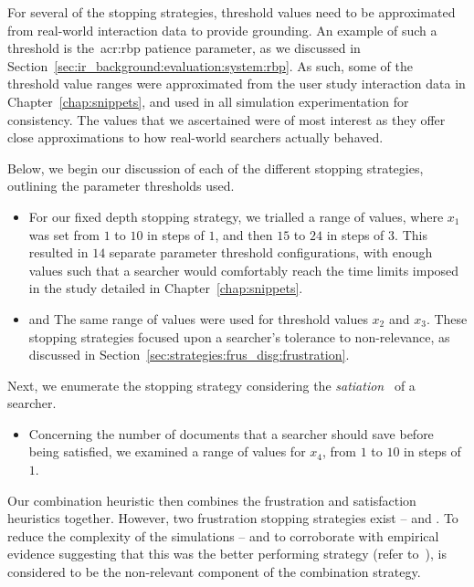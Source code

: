 For several of the stopping strategies, threshold values need to be approximated from real-world interaction data to provide grounding. An example of such a threshold is the~\gls{acr:rbp} patience parameter, as we discussed in Section~\ref{sec:ir_background:evaluation:system:rbp}. As such, some of the threshold value ranges were approximated from the user study interaction data in Chapter~\ref{chap:snippets}, and used in all simulation experimentation for consistency. The values that we ascertained were of most interest as they offer close approximations to how real-world searchers actually behaved.

Below, we begin our discussion of each of the different stopping strategies, outlining the parameter thresholds used.

\begin{itemize}
    \item{ For our fixed depth stopping strategy, we trialled a range of values, where $x_1$ was set from $1$ to $10$ in steps of $1$, and then $15$ to $24$ in steps of $3$. This resulted in $14$ separate parameter threshold configurations, with enough values such that a searcher would comfortably reach the time limits imposed in the study detailed in Chapter~\ref{chap:snippets}.}
    
    \item{ and  The same range of values were used for threshold values $x_2$ and $x_3$. These stopping strategies focused upon a searcher's tolerance to non-relevance, as discussed in Section~\ref{sec:strategies:frus_disg:frustration}.}
\end{itemize}

Next, we enumerate the stopping strategy considering the \emph{satiation}~\citep{simon1955satiation} of a searcher.

\begin{itemize}
    \item{ Concerning the number of documents that a searcher should save before being satisfied, we examined a range of values for $x_4$, from $1$ to $10$ in steps of $1$.}
\end{itemize}

Our combination heuristic then combines the frustration and satisfaction heuristics together. However, two frustration stopping strategies exist --  and . To reduce the complexity of the simulations -- and to corroborate with empirical evidence suggesting that this was the better performing strategy (refer to~\cite{maxwell2015stopping_strategies}),  is considered to be the non-relevant component of the combination strategy.

